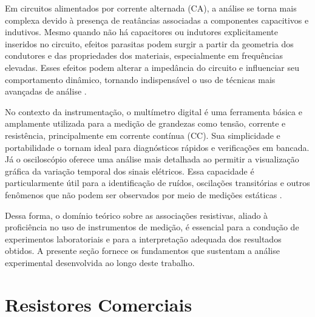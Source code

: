 \documentclass[conference]{IEEEtran}
\begin{document}
Em circuitos alimentados por corrente alternada (CA), a análise se torna mais complexa devido à presença de reatâncias associadas a componentes capacitivos e indutivos. Mesmo quando não há capacitores ou indutores explicitamente inseridos no circuito, efeitos parasitas podem surgir a partir da geometria dos condutores e das propriedades dos materiais, especialmente em frequências elevadas. Esses efeitos podem alterar a impedância do circuito e influenciar seu comportamento dinâmico, tornando indispensável o uso de técnicas mais avançadas de análise \cite{halliday}.

No contexto da instrumentação, o multímetro digital é uma ferramenta básica e amplamente utilizada para a medição de grandezas como tensão, corrente e resistência, principalmente em corrente contínua (CC). Sua simplicidade e portabilidade o tornam ideal para diagnósticos rápidos e verificações em bancada. Já o osciloscópio oferece uma análise mais detalhada ao permitir a visualização gráfica da variação temporal dos sinais elétricos. Essa capacidade é particularmente útil para a identificação de ruídos, oscilações transitórias e outros fenômenos que não podem ser observados por meio de medições estáticas \cite{hayt2019analise}.

Dessa forma, o domínio teórico sobre as associações resistivas, aliado à proficiência no uso de instrumentos de medição, é essencial para a condução de experimentos laboratoriais e para a interpretação adequada dos resultados obtidos. A presente seção fornece os fundamentos que sustentam a análise experimental desenvolvida ao longo deste trabalho.

\section{Resistores Comerciais}


\end{document}
